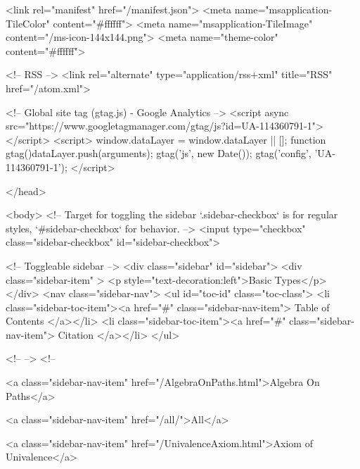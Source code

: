   <link rel="manifest" href="/manifest.json">
  <meta name="msapplication-TileColor" content="#ffffff">
  <meta name="msapplication-TileImage" content="/ms-icon-144x144.png">
  <meta name="theme-color" content="#ffffff">
  
  <!-- RSS -->
  <link rel="alternate" type="application/rss+xml" title="RSS" href="/atom.xml">

  <!-- Global site tag (gtag.js) - Google Analytics -->
  <script async src="https://www.googletagmanager.com/gtag/js?id=UA-114360791-1"></script>
  <script>
    window.dataLayer = window.dataLayer || [];
    function gtag(){dataLayer.push(arguments);}
    gtag('js', new Date());
    gtag('config', 'UA-114360791-1');
  </script>

  
</head>




  <body>
    <!-- Target for toggling the sidebar `.sidebar-checkbox` is for regular
     styles, `#sidebar-checkbox` for behavior. -->
<input type="checkbox" class="sidebar-checkbox" id="sidebar-checkbox">

<!-- Toggleable sidebar -->
<div class="sidebar" id="sidebar">
  <div class="sidebar-item" >
    <p style="text-decoration:left">Basic Types</p>
  </div>
  <nav class="sidebar-nav">
    <ul id="toc-id" class="toc-class">
  <li class="sidebar-toc-item"><a href="#" class="sidebar-nav-item"> Table of Contents </a></li>
  <li class="sidebar-toc-item"><a href="#" class="sidebar-nav-item"> Citation </a></li>
</ul>


    <!--  -->
    <!-- 
      
    
      
    
      
    
      
        
      
    
      
        
          <a class="sidebar-nav-item" href="/AlgebraOnPaths.html">Algebra On Paths</a>
        
      
    
      
        
          <a class="sidebar-nav-item" href="/all/">All</a>
        
      
    
      
        
          <a class="sidebar-nav-item" href="/UnivalenceAxiom.html">Axiom of Univalence</a>
        
      
    
      
        
